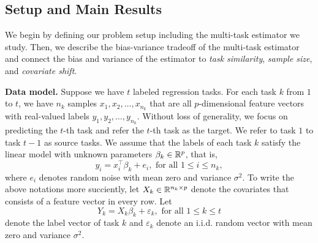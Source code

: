 \subsection{Setup and Main Results}
\label{sec_prelim}

We begin by defining our problem setup including the multi-task estimator we study.
Then, we describe the bias-variance tradeoff of the multi-task estimator and connect the bias and variance of the estimator to \textit{task similarity}, \textit{sample size}, and \textit{covariate shift}.



\noindent\textbf{Data model.}
Suppose we have $t$ labeled regression tasks. %
For each task $k$ from $1$ to $t$, we have $n_k$ samples $x_1, x_2, \dots, x_{n_k}$ that are all $p$-dimensional feature vectors with real-valued labels $y_1, y_2, \dots, y_{n_k}$.
Without loss of generality, we focus on predicting the $t$-th task and refer the $t$-th task as the target.
We refer to task $1$ to task $t-1$ as source tasks.
We assume that the labels of each task $k$ satisfy the linear model with unknown parameters $\beta_k\in\mathbb{R}^p$, that is,
	\[ y_i = x_i^{\top}\beta_k + e_i, \text{ for all } 1 \le i \le n_k, \]
where $e_i$ denotes random noise with mean zero and variance $\sigma^2$.
To write the above notations more succiently, let $X_k \in \mathbb{R}^{n_k \times p}$ denote the covariates that consists of a feature vector in every row.
Let
	\[ Y_k = X_k \beta_k + \varepsilon_k, \text{ for all } 1\le k \le t \] denote the label vector of task $k$ and $\varepsilon_k$ denote an i.i.d. random vector with mean zero and variance $\sigma^2$.

